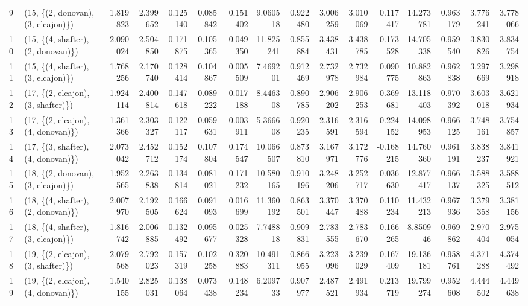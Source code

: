 \begin{tabular}{llrrrrrrrrrrrrrr}
9  &  (15, \{(2, donovan), (3, elcajon)\}) &  1.819823 &  2.399652 &   0.125140 &  0.085842 &  0.151402 &   9.060518 &  0.922480 &   3.006259 &  3.010069 &  0.117417 &  14.273781 &  0.963179 &  3.776241 &  3.778066 \\
10 &  (15, \{(4, shafter), (2, donovan)\}) &  2.090024 &  2.504850 &   0.171875 &  0.105365 &  0.049350 &  11.825241 &  0.855884 &   3.438431 &  3.438785 & -0.173528 &  14.705338 &  0.959540 &  3.830826 &  3.834754 \\
11 &  (15, \{(4, shafter), (3, elcajon)\}) &  1.768256 &  2.170740 &   0.128414 &  0.104867 &  0.005509 &   7.469201 &  0.912469 &   2.732978 &  2.732984 &  0.090775 &  10.882863 &  0.962838 &  3.297669 &  3.298918 \\
12 &  (17, \{(2, elcajon), (3, shafter)\}) &  1.924114 &  2.400814 &   0.147618 &  0.089222 &  0.017188 &   8.446308 &  0.890785 &   2.906202 &  2.906253 &  0.369681 &  13.118403 &  0.970392 &  3.603018 &  3.621934 \\
13 &  (17, \{(2, elcajon), (4, donovan)\}) &  1.361366 &  2.303327 &   0.122117 &  0.059631 & -0.003911 &   5.366608 &  0.920235 &   2.316591 &  2.316594 &  0.224152 &  14.098953 &  0.966125 &  3.748161 &  3.754857 \\
14 &  (17, \{(3, shafter), (4, donovan)\}) &  2.073042 &  2.452712 &   0.152174 &  0.107804 &  0.174547 &  10.066507 &  0.873810 &   3.167971 &  3.172776 & -0.168215 &  14.760360 &  0.961191 &  3.838237 &  3.841921 \\
15 &  (18, \{(2, donovan), (3, elcajon)\}) &  1.952565 &  2.263838 &   0.134814 &  0.081021 &  0.171232 &  10.580165 &  0.910196 &   3.248206 &  3.252717 & -0.036630 &  12.877417 &  0.966137 &  3.588325 &  3.588512 \\
16 &  (18, \{(4, shafter), (2, donovan)\}) &  2.007970 &  2.192505 &   0.166624 &  0.091093 &  0.016699 &  11.360192 &  0.863501 &   3.370447 &  3.370488 &  0.110234 &  11.432213 &  0.967936 &  3.379358 &  3.381156 \\
17 &  (18, \{(4, shafter), (3, elcajon)\}) &  1.816742 &  2.006885 &   0.132492 &  0.095677 &  0.025328 &   7.748818 &  0.909831 &   2.783555 &  2.783670 &  0.166265 &   8.850946 &  0.969862 &  2.970404 &  2.975054 \\
18 &  (19, \{(2, elcajon), (3, shafter)\}) &  2.079568 &  2.792023 &   0.157319 &  0.102258 &  0.320883 &  10.491311 &  0.866955 &   3.223096 &  3.239029 & -0.167409 &  19.136181 &  0.958761 &  4.371288 &  4.374492 \\
19 &  (19, \{(2, elcajon), (4, donovan)\}) &  1.540155 &  2.825031 &   0.138064 &  0.073438 &  0.148234 &   6.209733 &  0.907977 &   2.487521 &  2.491934 &  0.213719 &  19.799274 &  0.952608 &  4.444502 &  4.449638 \\

\end{tabular}
